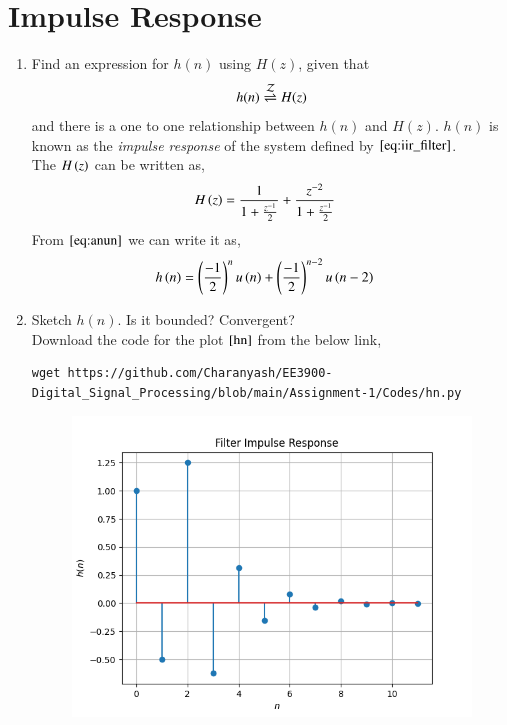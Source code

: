 \documentclass[journal,12pt,twocolumn]{IEEEtran}
\renewcommand\thesection{\arabic{section}}
\begin{document}
\section{Impulse Response}
  \begin{enumerate}[label=\thesection.\arabic*]
    \item \label{prob:impulse_resp}
      Find an expression for $h(n)$ using $H(z)$, given that 
      \begin{equation}
        \label{eq:impulse_resp}
        h(n) \overset{\mathcal{Z}}{ \rightleftharpoons} H(z)
      \end{equation}
      and there is a one to one relationship between $h(n)$ and $H(z)$. $h(n)$ is known as the {\em impulse response} of the system defined by $\eqref{eq:iir_filter}$.\\ 
    \solution The $H\left(z\right)$ can be written as,
      \begin{align}
         H\left(z\right) &= \frac{1}{1 + \frac{z^{-1}}{2}} + \frac{z^{-2}}{1+\frac{z^{-1}}{2}}
      \end{align}
      From $\eqref{eq:anun}$ we can write it as,
      \begin{align}
        h\left(n\right) &= \left(\frac{-1}{2}\right)^{n} u\left(n\right) + \left(\frac{-1}{2}\right)^{n-2} u\left(n-2\right)\label{eq:hn}
      \end{align}
    \item Sketch $h(n)$. Is it bounded? Convergent?\\
    \solution  Download the code for the plot $\ref{hn}$ from the below link,
     \begin{lstlisting}
wget https://github.com/Charanyash/EE3900-Digital_Signal_Processing/blob/main/Assignment-1/Codes/hn.py
     \end{lstlisting}
     \begin{figure}[ht!]
      \centering
      \includegraphics[width = \columnwidth]{hn.png}

\end{figure}
\end{enumerate}
\end{document}
